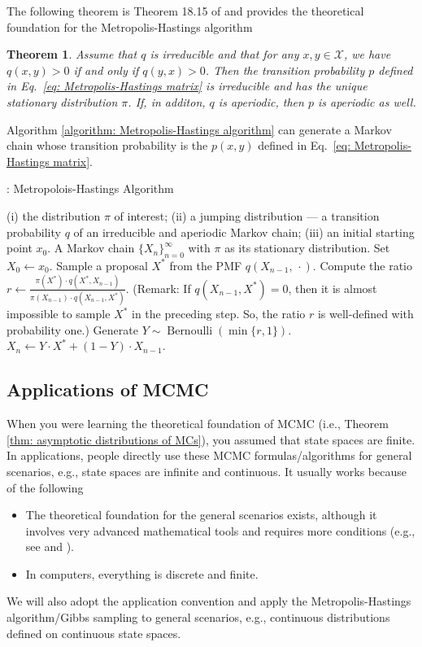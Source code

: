 \documentclass[11pt,letterpaper, leqno]{article}
\newtheorem{theorem}{Theorem}
\numberwithin{equation}{section}
\numberwithin{theorem}{section}
\numberwithin{lemma}{section}
\numberwithin{corollary}{section}
\numberwithin{definition}{section}
\numberwithin{proposition}{section}
\numberwithin{remark}{section}
\numberwithin{example}{section}
\begin{document}
The following theorem is Theorem 18.15 of \cite{klenke2013probability} and provides the theoretical foundation for the Metropolis-Hastings algorithm
\begin{theorem}\label{thm: Theorem 18.15 of Klenke}
Assume that $q$ is irreducible and that for any $x,y\in\mathcal{X}$, we have $q(x,y)>0$ if and only if $q(y,x)>0$. Then the transition probability $p$ defined in Eq.~\eqref{eq: Metropolis-Hastings matrix} is irreducible and has the unique stationary distribution $\pi$. If, in additon, $q$ is aperiodic, then $p$ is aperiodic as well.
\end{theorem}

Algorithm \ref{algorithm: Metropolis-Hastings algorithm} can generate a Markov chain whose transition probability is the $p(x,y)$ defined in Eq.~\eqref{eq: Metropolis-Hastings matrix}.
\begin{algorithm}
\caption{: Metropolois-Hastings Algorithm}\label{algorithm: Metropolis-Hastings algorithm}
\begin{algorithmic}[1]
    \INPUT (i) the distribution $\pi$ of interest; (ii) a jumping distribution --- a transition probability $q$ of an irreducible and aperiodic Markov chain; (iii) an initial starting point $x_0$.
    \OUTPUT A Markov chain $\{X_n\}_{n=0}^\infty$ with $\pi$ as its stationary distribution.
    \STATE Set $X_0 \leftarrow x_0$.
    \STATE Sample a proposal $X^*$ from the PMF $q(X_{n-1},\, \cdot)$.
    \STATE Compute the ratio $r\leftarrow\frac{\pi(X^*)\cdot q(X^*, X_{n-1})}{\pi(X_{n-1})\cdot q(X_{n-1}, X^*)}$. (Remark: If $q(X_{n-1}, X^*)=0$, then it is almost impossible to sample $X^*$ in the preceding step. So, the ratio $r$ is well-defined with probability one.)
    \STATE Generate $Y\sim \operatorname{Bernoulli}(\min\{r,1\})$.
    \STATE $X_n \leftarrow Y\cdot X^* + (1-Y)\cdot X_{n-1}$.
    \ENDFOR
\end{algorithmic}
\end{algorithm}


\subsection{Applications of MCMC}

When you were learning the theoretical foundation of MCMC (i.e., Theorem \ref{thm: asymptotic distributions of MCs}), you assumed that state spaces are finite. In applications, people directly use these MCMC formulas/algorithms for general scenarios, e.g., state spaces are infinite and continuous. It usually works because of the following
\begin{itemize}
    \item The theoretical foundation for the general scenarios exists, although it involves very advanced mathematical tools and requires more conditions (e.g., see \cite{tierney1994markov} and \cite{athreya1996convergence}).
    \item In computers, everything is discrete and finite.
\end{itemize}
We will also adopt the application convention and apply the Metropolis-Hastings algorithm/Gibbs sampling to general scenarios, e.g., continuous distributions defined on continuous state spaces.
\end{document}
